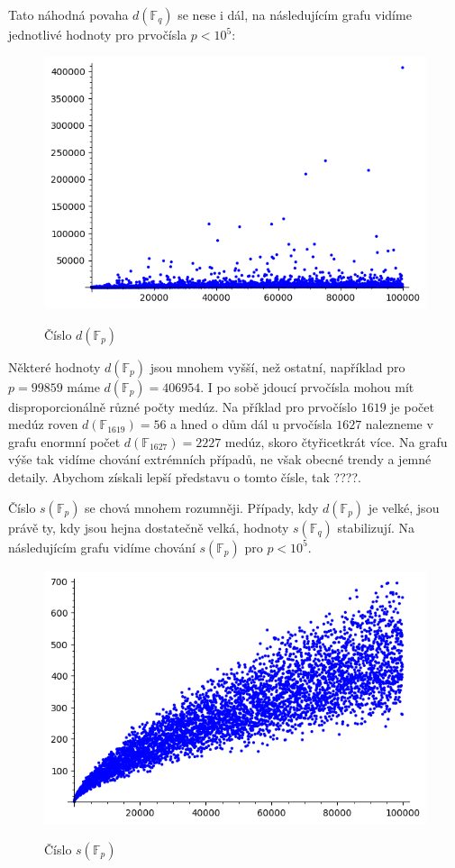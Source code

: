 \documentclass[12pt]{report}
\begin{document}
Tato náhodná povaha $d(\mathbb{F}_q)$ se nese i dál, na následujícím grafu vidíme jednotlivé hodnoty pro prvočísla $p < 10^5$:

\begin{figure}[h]
  \includegraphics[width=15cm]{MCount.png}
  \label{fig:boat1}
  \caption{Číslo $d(\mathbb{F}_p)$}
\end{figure}

Některé hodnoty $d(\mathbb{F}_p)$ jsou mnohem vyšší, než ostatní, například pro $p=99859$ máme $d(\mathbb{F}_p) = 406954$. I po sobě jdoucí prvočísla mohou mít disproporcionálně různé počty medúz. Na příklad pro prvočíslo $1619$ je počet medúz roven $d(\mathbb{F}_{1619}) = 56$ a hned o dům dál u prvočísla $1627$ nalezneme v grafu enormní počet $d(\mathbb{F}_{1627}) =2227$ medúz, skoro čtyřicetkrát více. Na grafu výše tak vidíme chování extrémních případů, ne však obecné trendy a jemné detaily. Abychom získali lepší představu o tomto čísle, tak ????. 


Číslo $s(\mathbb{F}_p)$ se chová mnohem rozumněji. Případy, kdy $d(\mathbb{F}_p)$ je velké, jsou právě ty, kdy jsou hejna dostatečně velká, hodnoty $s(\mathbb{F}_q)$ stabilizují. Na následujícím grafu vidíme chování $s(\mathbb{F}_p)$ pro $p<10^5$.

\begin{figure}[h]
  \includegraphics[width=15cm]{SCount.png}
  \label{fig:boat1}
  \caption{Číslo $s(\mathbb{F}_p)$}
\end{figure}
\end{document}
